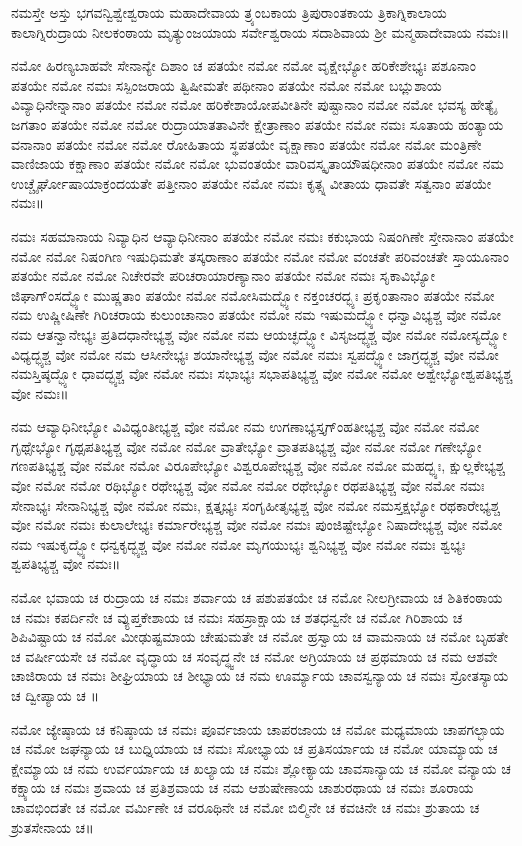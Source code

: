 ನಮಸ್ತೇ ಅಸ್ತು ಭಗವನ್ವಿಶ್ವೇಶ್ವರಾಯ ಮಹಾದೇವಾಯ ತ್ರ್ಯಂಬಕಾಯ ತ್ರಿಪುರಾಂತಕಾಯ  ತ್ರಿಕಾಗ್ನಿಕಾಲಾಯ ಕಾಲಾಗ್ನಿರುದ್ರಾಯ ನೀಲಕಂಠಾಯ ಮೃತ್ಯುಂಜಯಾಯ ಸರ್ವೇಶ್ವರಾಯ ಸದಾಶಿವಾಯ ಶ್ರೀ ಮನ್ಮಹಾದೇವಾಯ ನಮಃ॥

ನಮೋ ಹಿರಣ್ಯಬಾಹವೇ ಸೇನಾನ್ಯೇ ದಿಶಾಂ ಚ ಪತಯೇ ನಮೋ ನಮೋ ವೃಕ್ಷೇಭ್ಯೋ ಹರಿಕೇಶೇಭ್ಯಃ ಪಶೂನಾಂ ಪತಯೇ ನಮೋ ನಮಃ ಸಸ್ಪಿಂಜರಾಯ ತ್ವಿಷೀಮತೇ ಪಥೀನಾಂ ಪತಯೇ ನಮೋ ನಮೋ ಬಭ್ಲುಶಾಯ ವಿವ್ಯಾಧಿನೇನ್ನಾನಾಂ ಪತಯೇ ನಮೋ ನಮೋ ಹರಿಕೇಶಾಯೋಪವೀತಿನೇ ಪುಷ್ಟಾನಾಂ ನಮೋ ನಮೋ ಭವಸ್ಯ ಹೇತ್ಯೈ ಜಗತಾಂ ಪತಯೇ ನಮೋ ನಮೋ ರುದ್ರಾಯಾತತಾವಿನೇ ಕ್ಷೇತ್ರಾಣಾಂ ಪತಯೇ ನಮೋ ನಮಃ ಸೂತಾಯ ಹಂತ್ಯಾಯ ವನಾನಾಂ ಪತಯೇ ನಮೋ ನಮೋ ರೋಹಿತಾಯ ಸ್ಥಪತಯೇ ವೃಕ್ಷಾಣಾಂ ಪತಯೇ ನಮೋ ನಮೋ ಮಂತ್ರಿಣೇ ವಾಣಿಜಾಯ ಕಕ್ಷಾಣಾಂ ಪತಯೇ ನಮೋ ನಮೋ ಭುವಂತಯೇ ವಾರಿವಸ್ಕೃತಾಯೌಷಧೀನಾಂ ಪತಯೇ ನಮೋ ನಮ ಉಚ್ಚೈರ್ಘೋಷಾಯಾಕ್ರಂದಯತೇ ಪತ್ತೀನಾಂ ಪತಯೇ ನಮೋ ನಮಃ ಕೃತ್ಸ್ನ ವೀತಾಯ ಧಾವತೇ ಸತ್ವನಾಂ ಪತಯೇ ನಮಃ॥

ನಮಃ ಸಹಮಾನಾಯ ನಿವ್ಯಾಧಿನ ಆವ್ಯಾಧಿನೀನಾಂ ಪತಯೇ ನಮೋ ನಮಃ ಕಕುಭಾಯ ನಿಷಂಗಿಣೇ ಸ್ತೇನಾನಾಂ ಪತಯೇ ನಮೋ ನಮೋ ನಿಷಂಗಿಣ ಇಷುಧಿಮತೇ ತಸ್ಕರಾಣಾಂ ಪತಯೇ ನಮೋ ನಮೋ ವಂಚತೇ ಪರಿವಂಚತೇ ಸ್ತಾಯೂನಾಂ ಪತಯೇ ನಮೋ ನಮೋ ನಿಚೇರವೇ ಪರಿಚರಾಯಾರಣ್ಯಾನಾಂ ಪತಯೇ ನಮೋ ನಮಃ ಸೃಕಾವಿಭ್ಯೋ ಜಿಘಾಗ್ಂಸದ್ಭ್ಯೋ ಮುಷ್ಣತಾಂ ಪತಯೇ ನಮೋ ನಮೋಸಿಮದ್ಭ್ಯೋ ನಕ್ತಂಚರದ್ಭ್ಯಃ ಪ್ರಕೃಂತಾನಾಂ ಪತಯೇ ನಮೋ ನಮ ಉಷ್ಣೀಷಿಣೇ ಗಿರಿಚರಾಯ ಕುಲುಂಚಾನಾಂ ಪತಯೇ ನಮೋ ನಮ ಇಷುಮದ್ಭ್ಯೋ ಧನ್ವಾವಿಭ್ಯಶ್ಚ ವೋ ನಮೋ ನಮ ಆತನ್ವಾನೇಭ್ಯಃ  ಪ್ರತಿದಧಾನೇಭ್ಯಶ್ಚ ವೋ ನಮೋ ನಮ ಆಯಚ್ಛದ್ಭ್ಯೋ ವಿಸೃಜದ್ಭ್ಯಶ್ಚ ವೋ ನಮೋ ನಮೋಸ್ಯದ್ಭ್ಯೋ ವಿಧ್ಯದ್ಭ್ಯಶ್ಚ ವೋ ನಮೋ ನಮ ಆಸೀನೇಭ್ಯಃ ಶಯಾನೇಭ್ಯಶ್ಚ ವೋ ನಮೋ ನಮಃ ಸ್ವಪದ್ಭ್ಯೋ ಜಾಗ್ರದ್ಭ್ಯಶ್ಚ ವೋ ನಮೋ ನಮಸ್ತಿಷ್ಠದ್ಭ್ಯೋ ಧಾವದ್ಭ್ಯಶ್ಚ ವೋ ನಮೋ ನಮಃ ಸಭಾಭ್ಯಃ ಸಭಾಪತಿಭ್ಯಶ್ಚ ವೋ ನಮೋ ನಮೋ ಅಶ್ವೇಭ್ಯೋಶ್ವಪತಿಭ್ಯಶ್ಚ ವೋ ನಮಃ॥

ನಮ ಆವ್ಯಾಧಿನೀಭ್ಯೋ ವಿವಿಧ್ಯಂತೀಭ್ಯಶ್ಚ ವೋ ನಮೋ ನಮ ಉಗಣಾಭ್ಯಸ್ತೃಗ್ಂಹತೀಭ್ಯಶ್ಚ ವೋ ನಮೋ ನಮೋ ಗೃಥ್ಸೇಭ್ಯೋ ಗೃಥ್ಸಪತಿಭ್ಯಶ್ಚ ವೋ ನಮೋ ನಮೋ ವ್ರಾತೇಭ್ಯೋ ವ್ರಾತಪತಿಭ್ಯಶ್ಚ ವೋ ನಮೋ ನಮೋ ಗಣೇಭ್ಯೋ ಗಣಪತಿಭ್ಯಶ್ಚ ವೋ ನಮೋ ನಮೋ ವಿರೂಪೇಭ್ಯೋ ವಿಶ್ವರೂಪೇಭ್ಯಶ್ಚ ವೋ ನಮೋ ನಮೋ ಮಹದ್ಭ್ಯಃ, ಕ್ಷುಲ್ಲಕೇಭ್ಯಶ್ಚ ವೋ ನಮೋ ನಮೋ ರಥಿಭ್ಯೋ ರಥೇಭ್ಯಶ್ಚ ವೋ ನಮೋ ನಮೋ ರಥೇಭ್ಯೋ ರಥಪತಿಭ್ಯಶ್ಚ ವೋ ನಮೋ ನಮಃ ಸೇನಾಭ್ಯಃ ಸೇನಾನಿಭ್ಯಶ್ಚ ವೋ ನಮೋ ನಮಃ, ಕ್ಷತ್ತೃಭ್ಯಃ ಸಂಗೃಹೀತೃಭ್ಯಶ್ಚ ವೋ ನಮೋ ನಮಸ್ತಕ್ಷಭ್ಯೋ ರಥಕಾರೇಭ್ಯಶ್ಚ ವೋ ನಮೋ ನಮಃ ಕುಲಾಲೇಭ್ಯಃ ಕರ್ಮಾರೇಭ್ಯಶ್ಚ ವೋ ನಮೋ ನಮಃ ಪುಂಜಿಷ್ಟೇಭ್ಯೋ ನಿಷಾದೇಭ್ಯಶ್ಚ ವೋ ನಮೋ ನಮ ಇಷುಕೃದ್ಭ್ಯೋ ಧನ್ವಕೃದ್ಭ್ಯಶ್ಚ ವೋ ನಮೋ ನಮೋ ಮೃಗಯುಭ್ಯಃ ಶ್ವನಿಭ್ಯಶ್ಚ ವೋ ನಮೋ ನಮಃ ಶ್ವಭ್ಯಃ ಶ್ವಪತಿಭ್ಯಶ್ಚ ವೋ ನಮಃ॥

ನಮೋ ಭವಾಯ ಚ ರುದ್ರಾಯ ಚ ನಮಃ ಶರ್ವಾಯ ಚ ಪಶುಪತಯೇ ಚ ನಮೋ ನೀಲಗ್ರೀವಾಯ ಚ ಶಿತಿಕಂಠಾಯ ಚ ನಮಃ ಕಪರ್ದಿನೇ ಚ ವ್ಯುಪ್ತಕೇಶಾಯ ಚ ನಮಃ ಸಹಸ್ರಾಕ್ಷಾಯ ಚ ಶತಧನ್ವನೇ ಚ ನಮೋ ಗಿರಿಶಾಯ ಚ ಶಿಪಿವಿಷ್ಟಾಯ ಚ ನಮೋ ಮೀಢುಷ್ಟಮಾಯ ಚೇಷುಮತೇ ಚ ನಮೋ ಹ್ರಸ್ವಾಯ ಚ ವಾಮನಾಯ ಚ ನಮೋ ಬೃಹತೇ ಚ ವರ್ಷೀಯಸೇ ಚ ನಮೋ ವೃದ್ಧಾಯ ಚ ಸಂವೃದ್ಧ್ವನೇ ಚ ನಮೋ ಅಗ್ರಿಯಾಯ ಚ ಪ್ರಥಮಾಯ ಚ ನಮ ಆಶವೇ ಚಾಜಿರಾಯ ಚ ನಮಃ ಶೀಘ್ರಿಯಾಯ ಚ ಶೀಭ್ಯಾಯ ಚ ನಮ ಊರ್ಮ್ಯಾಯ ಚಾವಸ್ವನ್ಯಾಯ ಚ ನಮಃ  ಸ್ರೋತಸ್ಯಾಯ ಚ ದ್ವೀಪ್ಯಾಯ ಚ ॥

ನಮೋ ಜ್ಯೇಷ್ಠಾಯ ಚ ಕನಿಷ್ಠಾಯ ಚ ನಮಃ ಪೂರ್ವಜಾಯ ಚಾಪರಜಾಯ ಚ ನಮೋ ಮಧ್ಯಮಾಯ ಚಾಪಗಲ್ಭಾಯ ಚ ನಮೋ ಜಘನ್ಯಾಯ ಚ ಬುಧ್ನಿಯಾಯ ಚ ನಮಃ ಸೋಭ್ಯಾಯ ಚ ಪ್ರತಿಸರ್ಯಾಯ ಚ ನಮೋ ಯಾಮ್ಯಾಯ ಚ ಕ್ಷೇಮ್ಯಾಯ ಚ ನಮ ಉರ್ವರ್ಯಾಯ ಚ ಖಲ್ಯಾಯ ಚ ನಮಃ ಶ್ಲೋಕ್ಯಾಯ ಚಾವಸಾನ್ಯಾಯ ಚ ನಮೋ ವನ್ಯಾಯ ಚ ಕಕ್ಷ್ಯಾಯ ಚ ನಮಃ ಶ್ರವಾಯ ಚ ಪ್ರತಿಶ್ರವಾಯ ಚ ನಮ ಆಶುಷೇಣಾಯ ಚಾಶುರಥಾಯ ಚ ನಮಃ ಶೂರಾಯ ಚಾವಭಿಂದತೇ ಚ ನಮೋ ವರ್ಮಿಣೇ ಚ ವರೂಥಿನೇ ಚ ನಮೋ ಬಿಲ್ಮಿನೇ ಚ ಕವಚಿನೇ ಚ ನಮಃ ಶ್ರುತಾಯ ಚ ಶ್ರುತಸೇನಾಯ ಚ॥

